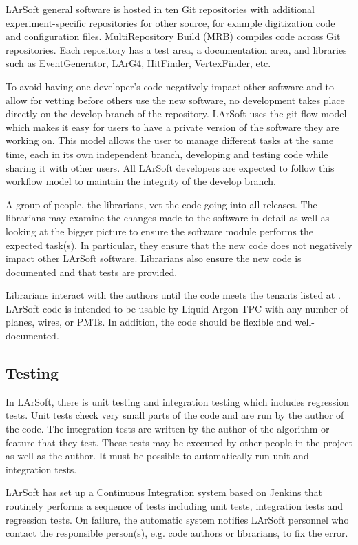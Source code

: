 \documentclass[12pt]{elsarticle}
\begin{document}
LArSoft general software is hosted in ten Git repositories with additional experiment-specific repositories for other source, for example digitization code and configuration files. MultiRepository Build (MRB) compiles code across Git repositories. Each repository has a test area, a documentation area, and libraries such as EventGenerator, LArG4, HitFinder, VertexFinder, etc.\cite{gian}

To avoid having one developer's code negatively impact other software and to allow for vetting before others use the new software, no development takes place directly on the develop branch of the repository. LArSoft uses the git-flow\cite{git-flow} model which makes it easy for users to have a private version of the software they are working on. This model allows the user to manage different tasks at the same time, each in its own independent branch, developing and testing code while sharing it with other users.\cite{git-control} All LArSoft developers are expected to follow this workflow model to maintain the integrity of the develop branch.

A group of people, the librarians, vet the code going into all releases. The librarians may examine the changes made to the software in detail as well as looking at the bigger picture to ensure the software module performs the expected task(s). In particular, they ensure that the new code does not negatively impact other LArSoft software. Librarians also ensure the new code is documented and that tests are provided.

Librarians interact with the authors until the code meets the tenants listed at \cite{code-tenants}. LArSoft code is intended to be usable by Liquid Argon TPC with any number of planes, wires, or PMTs. In addition, the code should be flexible and well-documented. 

\subsection{Testing}

In LArSoft, there is unit testing and integration testing which includes regression tests. Unit tests check very small parts of the code and are run by the author of the code. 
The integration tests are written by the author of the algorithm or feature that they test. These tests may be executed by other people in the project as well as the author. It must be possible to automatically run unit and  integration tests.

LArSoft has set up a Continuous Integration system based on Jenkins\cite{jenkins} that routinely performs a sequence of tests including unit tests, integration tests and regression tests. On failure, the automatic system notifies LArSoft personnel who contact the responsible person(s), e.g. code authors or librarians, to fix the error.
\end{document}

